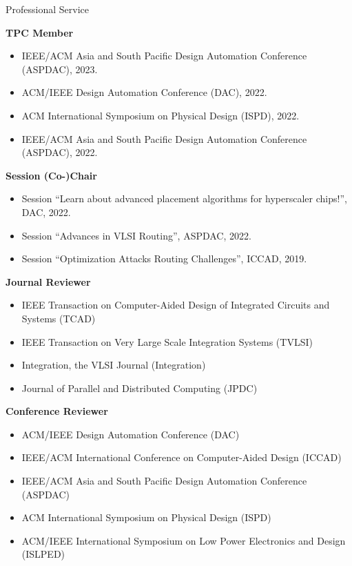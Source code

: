 
\begin{rSection}{Professional Service}

\textbf{TPC Member}
\begin{itemize}
    \item IEEE/ACM Asia and South Pacific Design Automation Conference (ASPDAC), 2023.
    \item ACM/IEEE Design Automation Conference (DAC), 2022.
    \item ACM International Symposium on Physical Design (ISPD), 2022.
    \item IEEE/ACM Asia and South Pacific Design Automation Conference (ASPDAC), 2022.
\end{itemize}

\textbf{Session (Co-)Chair}
\begin{itemize}
    \item Session ``Learn about advanced placement algorithms for hyperscaler chips!'', DAC, 2022.
    \item Session ``Advances in VLSI Routing'', ASPDAC, 2022.
    \item Session ``Optimization Attacks Routing Challenges'', ICCAD, 2019.
\end{itemize}

\textbf{Journal Reviewer}
\begin{itemize}
    \item IEEE Transaction on Computer-Aided Design of Integrated Circuits and Systems (TCAD)
    \item IEEE Transaction on Very Large Scale Integration Systems (TVLSI)
    \item Integration, the VLSI Journal (Integration)
    \item Journal of Parallel and Distributed Computing (JPDC)
\end{itemize}

\textbf{Conference Reviewer}
\begin{itemize}
    \item ACM/IEEE Design Automation Conference (DAC)
    \item IEEE/ACM International Conference on Computer-Aided Design (ICCAD)
    \item IEEE/ACM Asia and South Pacific Design Automation Conference (ASPDAC)
    \item ACM International Symposium on Physical Design (ISPD)
    \item ACM/IEEE International Symposium on Low Power Electronics and Design (ISLPED)
\end{itemize}
\end{rSection}


